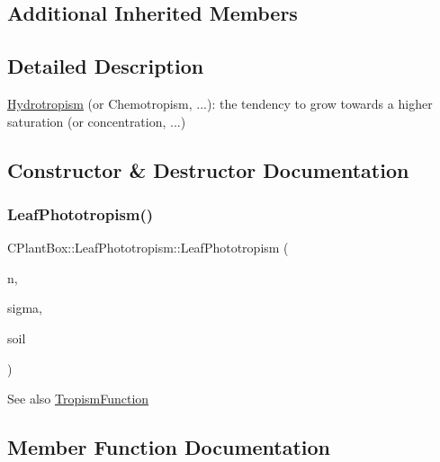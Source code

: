 \subsection*{Additional Inherited Members}


\subsection{Detailed Description}
\hyperlink{classCPlantBox_1_1Hydrotropism}{Hydrotropism} (or Chemotropism, ...)\+: the tendency to grow towards a higher saturation (or concentration, ...) 

\subsection{Constructor \& Destructor Documentation}
\mbox{\label{classCPlantBox_1_1LeafPhototropism_ad92daedd811b83ab7b6e8901dd9970dc}} 
\subsubsection{\texorpdfstring{Leaf\+Phototropism()}{LeafPhototropism()}}
{\footnotesize\ttfamily C\+Plant\+Box\+::\+Leaf\+Phototropism\+::\+Leaf\+Phototropism (\begin{DoxyParamCaption}\item[{double}]{n,  }\item[{double}]{sigma,  }\item[{\hyperlink{classCPlantBox_1_1SoilLookUp}{Soil\+Look\+Up} $\ast$}]{soil }\end{DoxyParamCaption})\hspace{0.3cm}{\ttfamily [inline]}}

\begin{DoxySeeAlso}{See also}
\hyperlink{classCPlantBox_1_1TropismFunction}{Tropism\+Function} 
\end{DoxySeeAlso}


\subsection{Member Function Documentation}
\mbox{\label{classCPlantBox_1_1LeafPhototropism_a9b9cee624adc576c2cc44b1b27b2ef0c}} 
